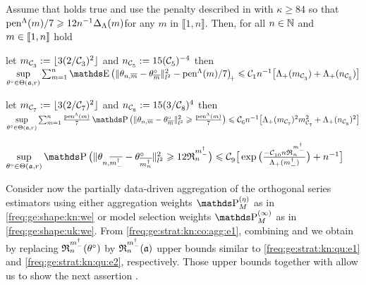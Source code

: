\begin{lm}\label{ak:re:nd:rest:ma}
Assume that  holds true and use the penalty described in  with $\kappa \geq 84$ so that $\penSv/7 \geq 12 n^{-1} \Delta_{\Lambda}(m)$for any $m$ in $\llbracket 1, n \rrbracket$.
Then, for all $\ssY\in\Nz$ and $\Di\in\nset{1,\ssY}$ hold
  \begin{resListeN}[]
  \item\label{ak:re:nd:rest1:ma} let $\Di_{\cst{3}}:=\floor{  3(2/\cst{3})^2}$ and $\ssY_{\cst{5}}:={15(\cst{5})^{-4}}$ then\\ 
    $\sup\limits_{\xdf \in \Theta(\mathfrak{a}, r)}\sum_{\Di=1}^{\ssY}\E
    \vectp{\Vnormlp{\txdfPr-\xdfPr}^2-\penSv/7}
    \leq \cst{1}\ssY^{-1}\big[\miSv[\Di_{\cst{3}}] + \miSv[\ssY_{\cst{5}}]\big]$
  \item\label{ak:re:nd:rest2:ma} let
    $\Di_{\cst{7}}:=\floor{3(2 / \cst{7})^2}$ and
    $\ssY_{\cst{8}}:=15(3/\cst{8})^4$ then\\
    $\sup\limits_{\xdf \in \Theta(\mathfrak{a}, r)}\sum_{\Di=1}^{\ssY}\tfrac{\penSv}{7}\P\big(\Vnormlp{\txdfPr-\xdfPr}^2
    \geq\tfrac{\penSv}{7}\big)\leq\cst{6} n^{-1} \big[\miSv[\Di_{\cst{7}}]^2\Di_{\cst{7}}^2+\miSv[\ssY_{\cst{8}}]^2\big]$
  \item\label{ak:re:nd:rest3:ma} 
  $\sup\limits_{\xdf \in \Theta(\mathfrak{a}, r)}\P\big(\Vnormlp{\theta_{n, \overline{m^{\dagger}_{-}}}-\theta^{\circ}_{\overline{m^{\dagger}_{n}}}}^2 \geq 12\daRaS{\mdDi}{\xdf,\Lambda}\big)\leq 
    \cst{9} \big[\exp\big(\tfrac{-\cst{10}\ssY\daRaS{\mdDi}{\xdf,\Lambda}}{\Lambda_{+}(\mdDi)}\big)+\ssY^{-1}\big]$
  \end{resListeN}
  \reEnd
\end{lm}
\begin{te}
  Consider now the partially data-driven aggregation of the orthogonal series estimators using either aggregation weights $\rWe[]$ as in \eqref{freq:ge:shape:kn:we} or model selection weights $\msWe[]$ as in \eqref{freq:ge:shape:uk:we}.
  From \eqref{freq:ge:strat:kn:co:agg:e1}, combining  and  we obtain by replacing $\daRa{\mdDi}{(\xdf)}$ by $\daRa{\mdDi}{(\xdfCw[])}$ upper bounds similar to \eqref{freq:ge:strat:kn:qu:e1} and  \eqref{freq:ge:strat:kn:qu:e2}, respectively.
  Those upper bounds together with  allow us to show the next assertion .
\end{te}
